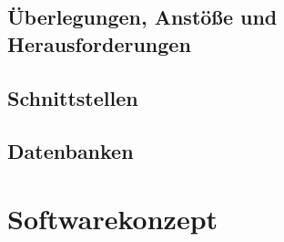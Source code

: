     \subsection{Überlegungen, Anstöße und Herausforderungen}



    
    \subsection{Schnittstellen}
    
    \subsection{Datenbanken}

\section{Softwarekonzept}
\label{sec:softwarekonzept}

